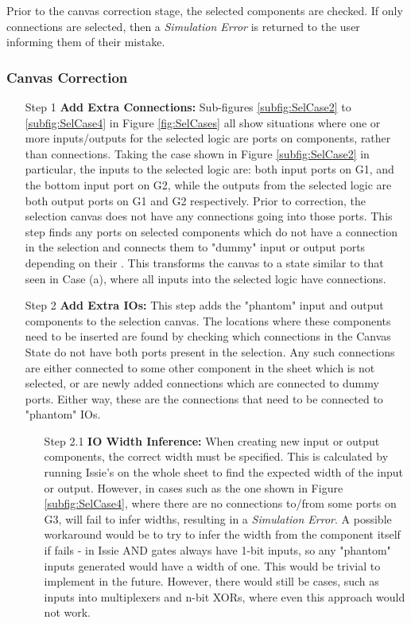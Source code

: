 Prior to the canvas correction stage, the selected components are checked. If only connections are selected, then a \textit{Simulation Error} is returned to the user informing them of their mistake.

\subsubsection{Canvas Correction}
\begin{itemize}
    \item[Step 1] \textbf{Add Extra Connections:} Sub-figures \ref{subfig:SelCase2} to \ref{subfig:SelCase4} in Figure \ref{fig:SelCases} all show situations where one or more inputs/outputs for the selected logic are ports on components, rather than connections. Taking the case shown in Figure \ref{subfig:SelCase2} in particular, the inputs to the selected logic are: both input ports on G1, and the bottom input port on G2, while the outputs from the selected logic are both output ports on G1 and G2 respectively. Prior to correction, the selection canvas does not have any connections going into those ports. This step finds any ports on selected components which do not have a connection in the selection and connects them to "dummy" input or output ports depending on their . This transforms the canvas to a state similar to that seen in Case (a), where   all inputs into the selected logic have connections.
    \item[Step 2] \textbf{Add Extra IOs:} This step adds the "phantom" input and output components to the selection canvas. The locations where these components need to be inserted are found by checking which connections in the Canvas State do not have both ports present in the selection. Any such connections are either connected to some other component in the sheet which is not selected, or are newly added connections which are connected to dummy ports. Either way, these are the connections that need to be connected to "phantom" IOs. 
    \begin{itemize}
        \item[Step 2.1] \textbf{IO Width Inference:} When creating new input or output components, the correct width must be specified. This is         calculated by running Issie's  on the whole sheet to find the expected width of the input or output. However, in cases such as the one shown in Figure \ref{subfig:SelCase4}, where there are no connections to/from some ports on G3,  will fail to infer widths, resulting in a \textit{Simulation Error}. A possible workaround would be to try to infer the width from the component itself if  fails - in Issie AND gates always have 1-bit inputs, so any "phantom" inputs generated would have a width of one. This would be trivial to implement in the future. However, there would still be cases, such as inputs into multiplexers and n-bit XORs, where even this approach would not work.

\end{itemize}
\end{itemize}
